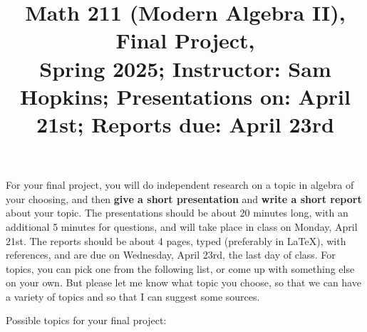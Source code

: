 \documentclass[11pt]{article}
\title{Math 211 (Modern Algebra II), Final Project, \\ {\normalsize Spring 2025; Instructor: Sam Hopkins; Presentations on: April 21st; Reports due: April 23rd}}
\date{}
\begin{document}
\maketitle

\thispagestyle{empty}

\vspace{-1.5cm}

For your final project, you will do independent research on a topic in algebra of your choosing, and then {\bf give a short presentation} and {\bf write a short report} about your topic. The presentations should be about 20 minutes long, with an additional 5 minutes for questions, and will take place in class on Monday, April 21st. The reports should be about 4 pages, typed (preferably in LaTeX), with references, and are due on Wednesday, April 23rd, the last day of class. For topics, you can pick one from the following list, or come up with something else on your own. But please let me know what topic you choose, so that we can have a variety of topics and so that I can suggest some sources.

Possible topics for your final project:

\vspace{-0.2cm}
\end{document}
